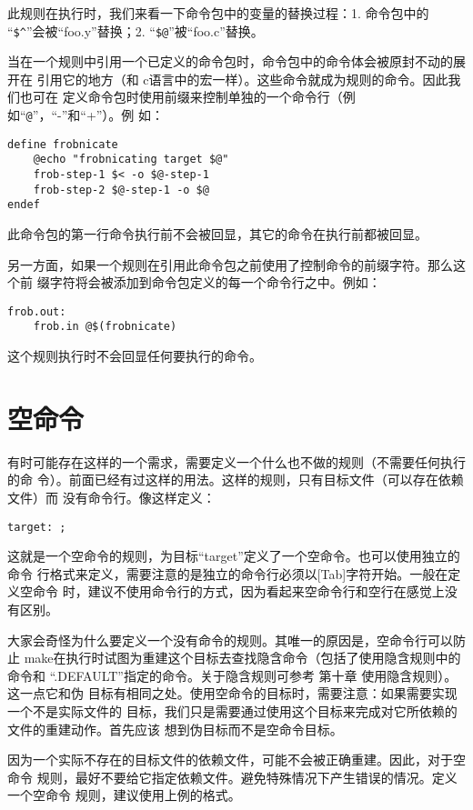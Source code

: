 \noindent 此规则在执行时，我们来看一下命令包中的变量的替换过程：1. 命令包中的
“\verb"$^"”会被“foo.y”替换；2. “\verb"$@"”被“foo.c”替换。

当在一个规则中引用一个已定义的命令包时，命令包中的命令体会被原封不动的展开在
引用它的地方（和 c语言中的宏一样）。这些命令就成为规则的命令。因此我们也可在
定义命令包时使用前缀来控制单独的一个命令行（例如“\verb"@"”，“-”和“+”）。例
如：
\begin{Verbatim}[]
define frobnicate
    @echo "frobnicating target $@"
    frob-step-1 $< -o $@-step-1
    frob-step-2 $@-step-1 -o $@
endef
\end{Verbatim}
\noindent
此命令包的第一行命令执行前不会被回显，其它的命令在执行前都被回显。

另一方面，如果一个规则在引用此命令包之前使用了控制命令的前缀字符。那么这个前
缀字符将会被添加到命令包定义的每一个命令行之中。例如：
\begin{Verbatim}[]
frob.out:
    frob.in @$(frobnicate)
\end{Verbatim}
\noindent
这个规则执行时不会回显任何要执行的命令。

\section{空命令}
有时可能存在这样的一个需求，需要定义一个什么也不做的规则（不需要任何执行的命
令）。前面已经有过这样的用法。这样的规则，只有目标文件（可以存在依赖文件）而
没有命令行。像这样定义：
\begin{Verbatim}[]
target: ;
\end{Verbatim}

这就是一个空命令的规则，为目标“target”定义了一个空命令。也可以使用独立的命令
行格式来定义，需要注意的是独立的命令行必须以[Tab]字符开始。一般在定义空命令
时，建议不使用命令行的方式，因为看起来空命令行和空行在感觉上没有区别。

大家会奇怪为什么要定义一个没有命令的规则。其唯一的原因是，空命令行可以防止
make在执行时试图为重建这个目标去查找隐含命令（包括了使用隐含规则中的命令和
“.DEFAULT”指定的命令。关于隐含规则可参考 第十章 使用隐含规则）。这一点它和伪
目标有相同之处。使用空命令的目标时，需要注意：如果需要实现一个不是实际文件的
目标，我们只是需要通过使用这个目标来完成对它所依赖的文件的重建动作。首先应该
想到伪目标而不是空命令目标。

因为一个实际不存在的目标文件的依赖文件，可能不会被正确重建。因此，对于空命令
规则，最好不要给它指定依赖文件。避免特殊情况下产生错误的情况。定义一个空命令
规则，建议使用上例的格式。
